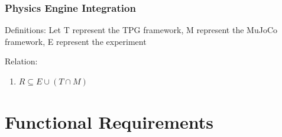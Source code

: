 \documentclass[12pt]{article}
\begin{document}
\subsubsection{Physics Engine Integration}

Definitions: Let T represent the TPG framework, M represent the MuJoCo framework, E represent the experiment

Relation:
\begin{enumerate}
  \item \begin{math}
    R \subseteq E \cup (T \cap M)
  \end{math}
\end{enumerate}

\section{Functional Requirements}
\end{document}
